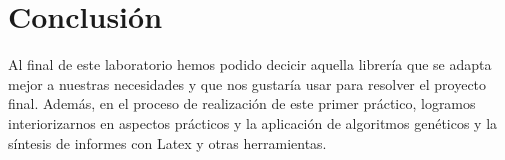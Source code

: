 \documentclass[9pt,conference]{IEEEtran}
\begin{document}
	\section{Conclusi\'on}
	Al final de este laboratorio hemos podido decicir aquella librer\'ia que se adapta mejor a nuestras necesidades y que nos gustar\'ia usar para resolver el proyecto final. Adem\'as, en el proceso de realizaci\'on de este primer pr\'actico, logramos interiorizarnos en aspectos pr\'acticos y la aplicaci\'on de algoritmos gen\'eticos y la s\'intesis de informes con Latex y otras herramientas.



	
	{}
\end{document}
